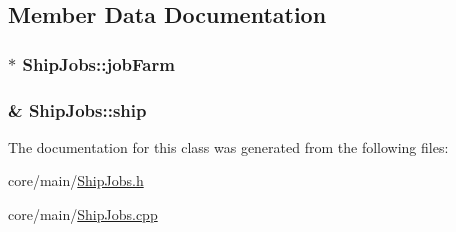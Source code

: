 \subsection{Member Data Documentation}
\hypertarget{classShipJobs_ac9319906c1485fe075283f56a635937a}{
\subsubsection[{job\-Farm}]{$\ast$ Ship\-Jobs\-::job\-Farm}}\label{classShipJobs_ac9319906c1485fe075283f56a635937a}
\hypertarget{classShipJobs_a2112b563f2d3a78fbab5fd4e12c03fc0}{
\subsubsection[{ship}]{\& Ship\-Jobs\-::ship}}\label{classShipJobs_a2112b563f2d3a78fbab5fd4e12c03fc0}


The documentation for this class was generated from the following files\-:\begin{DoxyCompactItemize}
\item 
core/main/\hyperlink{ShipJobs_8h}{Ship\-Jobs.\-h}\item 
core/main/\hyperlink{ShipJobs_8cpp}{Ship\-Jobs.\-cpp}\end{DoxyCompactItemize}
